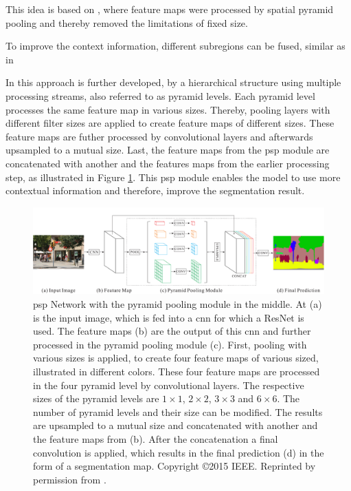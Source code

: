 This idea is based on \cite{He15-SPP}, where feature maps were processed by spatial pyramid pooling and thereby removed the limitations of fixed size.

To improve the context information, different subregions can be fused, similar as in 

In \cite{Zhao17-PSP} this approach is further developed, by a hierarchical structure using multiple processing streams, also referred to as pyramid levels.
Each pyramid level processes the same feature map in various sizes.
Thereby, pooling layers with different filter sizes are applied to create feature maps of different sizes.
These feature maps are futher processed by convolutional layers and afterwards upsampled to a mutual size.
Last, the feature maps from the \gls{psp} module are concatenated with another and the features maps from the earlier processing step, as illustrated in Figure \ref{fig:ch2:sec2:psp}.
This \gls{psp} module enables the model to use more contextual information and therefore, improve the segmentation result.
\begin{figure}
	\includegraphics[width=\linewidth]{figures/chap223_psp.png}
	\caption[Pyramid Scene Parsing Network]{
		\gls{psp} Network with the pyramid pooling module in the middle.
		At (a) is the input image, which is fed into a \gls{cnn} for which a ResNet is used. 
		The feature maps (b) are the output of this \gls{cnn} and further processed in the pyramid pooling module (c).
		First, pooling with various sizes is applied, to create four feature maps of various sized, illustrated in different colors.
		These four feature maps are processed in the four pyramid level by convolutional layers.
		The respective sizes of the pyramid levels are $1 \times 1$, $2 \times 2$, $3 \times 3$ and  $6 \times 6$.
		The number of pyramid levels and their size can be modified.
		The results are upsampled to a mutual size and concatenated with another and the feature maps from (b).
		After the concatenation a final convolution is applied, which results in the final prediction (d) in the form of a segmentation map.
		Copyright \copyright 2015 IEEE. Reprinted by permission from \cite{Zhao17-PSP}.}
	\label{fig:ch2:sec2:psp}
\end{figure}



